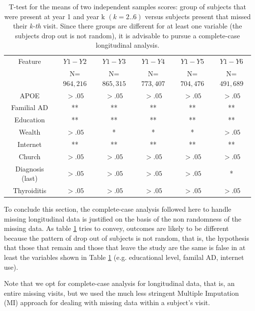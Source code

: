 \documentclass[11pt]{article}
\theoremstyle{definition}
\theoremstyle{remark}
\begin{document}
\begin{table}
  \centering
\begin{tabular}{cccccc} \toprule
    {Feature}   & {${Y1-Y2}$} & {${Y1-Y3}$} & {${Y1-Y4}$} & {${Y1-Y5}$} & {${Y1-Y6}$} \\ 
                & N={${964,216}$} & N={${865,315}$} & N={${773,407}$} & N={${704,476}$} & N={${491,689}$} \\  \midrule
    {APOE}           & $>.05$ & $>.05$ & $>.05$ & $>.05$ & $>.05$ \\
    {Familial AD}    & ** & ** & ** & ** & ** \\ %
    {Education}      & ** & ** & ** & ** & ** \\
    {Wealth}         & $>.05$  & *  & *  & * & $>.05$ \\ 
    {Internet}       & ** & ** & ** & ** & ** \\ 
    {Church}         & $>.05$ & $>.05$ & $>.05$ & $>.05$ & $>.05$  \\
    {Diagnosis (last)} & $>.05$ & $>.05$ & $>.05$ & $>.05$ & *  \\
    {Thyroiditis}    & $>.05$ & $>.05$ & $>.05$ & $>.05$ & $>.05$  \\ \bottomrule
\end{tabular}
\caption{T-test for the means of two independent samples scores: 
group of subjects that were present at year 1 and year k $(k=2..6)$ versus subjects present that missed their \emph{k-th} visit. Since there groups are different for at least one variable (the subjects drop out is not random), it is advisable to pursue a complete-case longitudinal analysis.}
\label{tab:testloyals}
\end{table} 

To conclude this section, the complete-case analysis followed here to handle missing longitudinal data is justified on the basis of the non randomness of the missing data. As table \ref{tab:testloyals} tries to convey, outcomes are likely to be different because the pattern of drop out of subjects is not random, that is, the hypothesis that those that remain and those that leave the study are the same is false in at least the variables shown in Table \ref{tab:testloyals} (e.g. educational level, familal AD, internet use).

Note that we opt for complete-case analysis for longitudinal data, that is, an entire missing visits, but we used the much less stringent Multiple Imputation (MI) \cite{buuren2010mice} approach for dealing with missing data within a subject's visit.
\end{document}
